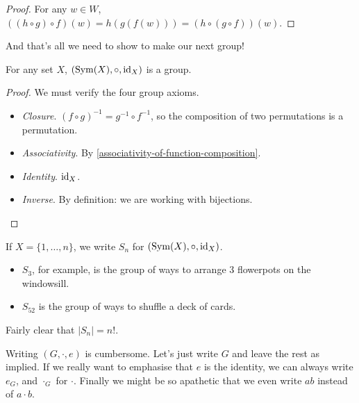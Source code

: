 \documentclass{../../template/note}
\begin{document}
    \begin{proof}
        For any \(w \in W\), \(((h \circ g) \circ f)(w) = h(g(f(w))) = (h \circ (g \circ f))(w)\).
    \end{proof}
    
    And that's all we need to show to make our next group!

    \begin{proposition}
        For any set \(X\), \((\operatorname{Sym}(X), \circ, \operatorname{id}_X)\) is a group.
    \end{proposition}
    
    \begin{proof}
        We must verify the four group axioms.
        \begin{itemize}
            \item \emph{Closure}. \((f \circ g)^{-1} = g^{-1} \circ f^{-1}\), so the composition of two permutations is a permutation.
            \item \emph{Associativity}. By \cref{associativity-of-function-composition}.
            \item \emph{Identity}. \(\operatorname{id}_X\).
            \item \emph{Inverse}. By definition: we are working with bijections.
        \end{itemize}
        
        
    \end{proof}
    
    \begin{definition}
        If \(X = \{1, \dots, n\}\), we write \(S_n\) for \((\operatorname{Sym}(X), \circ, \operatorname{id}_X)\).
    \end{definition}
    
    \begin{example*}
        \begin{itemize}
            \item \(S_3\), for example, is the group of ways to arrange 3 flowerpots on the windowsill.
            \item \(S_{52}\) is the group of ways to shuffle a deck of cards.
        \end{itemize}
    \end{example*}
    
    \noindent Fairly clear that \(|S_n| = n!\).

    \begin{remark*}[Notation]
        Writing \((G, \cdot, e)\) is cumbersome. Let's just write \(G\) and leave the rest as implied. If we really want to emphasise that \(e\) is the identity, we can always write \(e_G\), and \(\cdot_G\) for \(\cdot\). Finally we might be so apathetic that we even write \(ab\) instead of \(a \cdot b\).
    \end{remark*}
    
\end{document}
